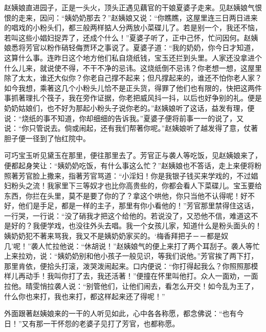 \begin{parag}


    赵姨娘直进园子，正是一头火，顶头正遇见藕官的干娘夏婆子走来。见赵姨娘气恨恨的走来，因问：“姨奶奶那去？”赵姨娘又说：“你瞧瞧，这屋里连三日两日进来的唱戏的小粉头们，都三般两样掂人分两放小菜碟儿了。若是别一个，我还不恼，若叫这些小娼妇捉弄了，还成个什么！”夏婆子听了，正中己怀，忙问因何。赵姨娘悉将芳官以粉作硝轻侮贾环之事说了。夏婆子道：“我的奶奶，你今日才知道，这算什么事。连昨日这个地方他们私自烧纸钱，宝玉还拦到头里。人家还没拿进个什么儿来，就说使不得，不干不净的忌讳。这烧纸倒不忌讳？你老想一想，这屋里除了太太，谁还大似你？你老自己撑不起来；但凡撑起来的，谁还不怕你老人家？如今我想，乘著这几个小粉头儿恰不是正头货，得罪了他们也有限的，快把这两件事抓著理扎个筏子，我在旁作证据，你老把威风抖一抖，以后也好争别的礼。便是奶奶姑娘们，也不好为那起小粉头子说你老的。”赵姨娘听了这话，益发有理，便说：“烧纸的事不知道，你却细细的告诉我。”夏婆子便将前事一一的说了，又说：“你只管说去。倘或闹起，还有我们帮著你呢。”赵姨娘听了越发得了意，仗著胆子便一径到了怡红院中。
\end{parag}


\begin{parag}


    可巧宝玉听见黛玉在那里，便往那里去了。芳官正与袭人等吃饭，见赵姨娘来了，便都起身笑让：“姨奶奶吃饭，有什么事这么忙？”赵姨娘也不答话，走上来便将粉照著芳官脸上撒来，指著芳官骂道：“小淫妇！你是我银子钱买来学戏的，不过娼妇粉头之流！我家里下三等奴才也比你高贵些的，你都会看人下菜碟儿。宝玉要给东西，你拦在头里，莫不是要了你的了？拿这个哄他，你只当他不认得呢！好不好，他们是手足，都是一样的主子，那里有你小看他的！”芳官那里禁得住这话，一行哭，一行说：“没了硝我才把这个给他的。若说没了，又恐他不信，难道这不是好的？我便学戏，也没往外头去唱。我一个女孩儿家，知道什么是粉头面头的！姨奶奶犯不著来骂我，我又不是姨奶奶家买的。‘梅香拜把子－－都是奴几’呢！”袭人忙拉他说：“休胡说！”赵姨娘气的便上来打了两个耳刮子。袭人等忙上来拉劝，说：“姨奶奶别和他小孩子一般见识，等我们说他。”芳官挨了两下打，那里肯依，便拾头打滚，泼哭泼闹起来。口内便说：“你打得起我么？你照照那模样儿再动手！我叫你打了去，我还活著！”便撞在怀里叫他打。众人一面劝，一面拉他。晴雯悄拉袭人说：“别管他们，让他们闹去，看怎么开交！如今乱为王了，什么你也来打，我也来打，都这样起来还了得呢！”
\end{parag}


\begin{parag}


    外面跟著赵姨娘来的一干的人听见如此，心中各各称愿，都念佛说：“也有今日！”又有那一干怀怨的老婆子见打了芳官，也都称愿。
\end{parag}


